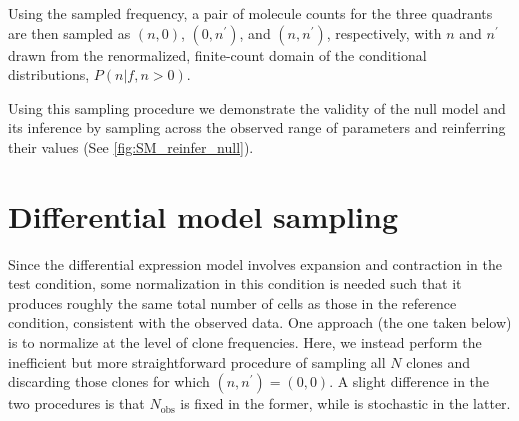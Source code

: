 \documentclass[letterpaper,english,prl,reprint,longbibliography]{revtex4-1} %
\begin{document}
Using the sampled frequency, a pair of molecule counts for the three quadrants are then sampled as $(n,0)$, $(0,n^{\prime})$, and $(n,n^{\prime})$, respectively, with $n$ and $n^{\prime}$ drawn from the renormalized, finite-count domain of the conditional distributions, $P(n|f,n>0)$. 

% 

Using this sampling procedure we demonstrate the validity of the null model and its inference by sampling across the observed range of parameters and reinferring their values (See \cref{fig:SM_reinfer_null}).


\section{Differential model sampling}\label{sec:diffexpr_sampling}
Since the differential expression model involves expansion and contraction in the test condition, some normalization in this condition is needed such that it produces roughly the same total number of cells as those in the reference condition, consistent with the observed data. One approach (the one taken below) is to normalize at the level of clone frequencies. 
Here, we instead perform the inefficient but more straightforward procedure of sampling all $N$ clones and discarding those clones for which $(n,n^{\prime})=(0,0)$. A slight difference in the two procedures is that $N_{\textrm{obs}}$ is fixed in the former, while is stochastic in the latter.
\end{document}
